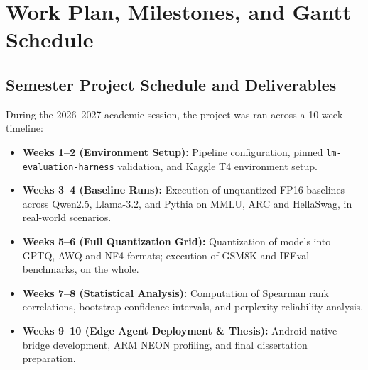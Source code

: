 \documentclass[12pt,a4paper,oneside]{report}
\begin{document}
    \chapter{Work Plan, Milestones, and Gantt Schedule}

    \section{Semester Project Schedule and Deliverables}
    During the 2026--2027 academic session, the project was ran across a 10-week timeline:
    \begin{itemize}[leftmargin=*]
        \item \textbf{Weeks 1--2 (Environment Setup):} Pipeline configuration, pinned \texttt{lm-evaluation-harness} validation, and Kaggle T4 environment setup.
        \item \textbf{Weeks 3--4 (Baseline Runs):} Execution of unquantized FP16 baselines across Qwen2.5, Llama-3.2, and Pythia on MMLU, ARC and HellaSwag, in real-world scenarios.
        \item \textbf{Weeks 5--6 (Full Quantization Grid):} Quantization of models into GPTQ, AWQ and NF4 formats; execution of GSM8K and IFEval benchmarks, on the whole.
        \item \textbf{Weeks 7--8 (Statistical Analysis):} Computation of Spearman rank correlations, bootstrap confidence intervals, and perplexity reliability analysis.
        \item \textbf{Weeks 9--10 (Edge Agent Deployment & Thesis):} Android native bridge development, ARM NEON profiling, and final dissertation preparation.
    \end{itemize}

    \begin{table}[h!]
    \centering
    \caption{10-Week Minor Project Execution Milestones}
    \label{tab:gantt_table}
    \renewcommand{\arraystretch}{1.2}
    \end{table}
\end{document}
